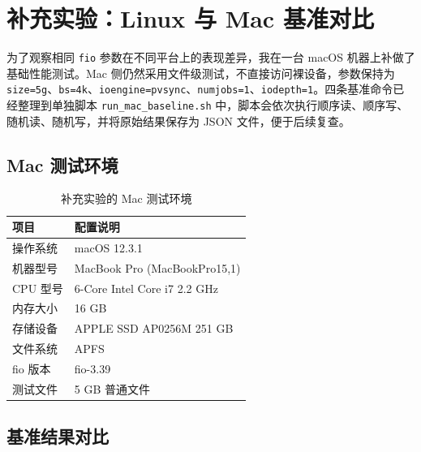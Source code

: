 \documentclass[a4paper]{article}
\begin{document}
\newpage
\section{补充实验：Linux 与 Mac 基准对比}

为了观察相同 \texttt{fio} 参数在不同平台上的表现差异，我在一台 macOS 机器上补做了基础性能测试。Mac 侧仍然采用文件级测试，不直接访问裸设备，参数保持为 \texttt{size=5g}、\texttt{bs=4k}、\texttt{ioengine=pvsync}、\texttt{numjobs=1}、\texttt{iodepth=1}。四条基准命令已经整理到单独脚本 \texttt{run\_mac\_baseline.sh} 中，脚本会依次执行顺序读、顺序写、随机读、随机写，并将原始结果保存为 JSON 文件，便于后续复查。

\subsection{Mac 测试环境}

\begin{table}[H]
  \centering
  \renewcommand{\arraystretch}{1.25}
  \setlength{\tabcolsep}{10pt}
  \begin{tabular}{ll}
    \toprule
    \textbf{项目} & \textbf{配置说明} \\
    \midrule
    操作系统   & macOS 12.3.1 \\
    机器型号   & MacBook Pro (MacBookPro15,1) \\
    CPU 型号   & 6-Core Intel Core i7 2.2 GHz \\
    内存大小   & 16 GB \\
    存储设备   & APPLE SSD AP0256M 251 GB \\
    文件系统   & APFS \\
    fio 版本   & fio-3.39 \\
    测试文件   & 5 GB 普通文件 \\
    \bottomrule
  \end{tabular}
  \caption{补充实验的 Mac 测试环境}
  \label{tab:mac_env}
\end{table}

\subsection{基准结果对比}
\end{document}
